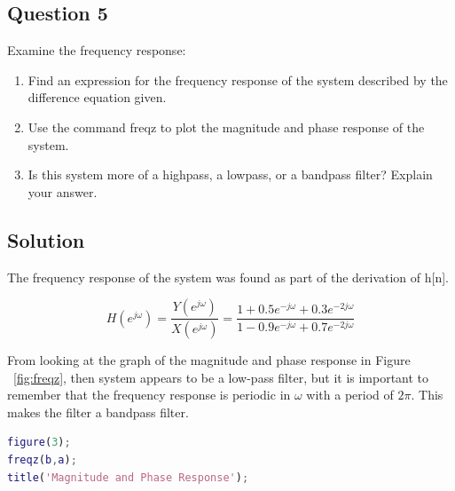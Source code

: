 \documentclass{article}
\begin{document}
\newpage
\subsection*{Question 5}

\begin{par}
Examine the frequency response:
\end{par} \vspace{1em}
\begin{enumerate}
\setlength{\itemsep}{-1ex}
   \item Find an expression for the frequency response of the system described by the difference equation given.
   \item Use the command freqz to plot the magnitude and phase response of the system.
   \item Is this system more of a highpass, a lowpass, or a bandpass filter? Explain your answer.
\end{enumerate}


\subsection*{Solution}

\begin{par}
The frequency response of the system was found as part of the derivation of h[n].
\end{par} \vspace{1em}
\begin{par}
$$H(e^{j\omega}) = \frac{Y(e^{j\omega})}{X(e^{j\omega})} =
\frac{1 + 0.5e^{-j\omega} + 0.3e^{-2j\omega}}
{1 - 0.9e^{-j\omega} + 0.7e^{-2j\omega}}$$
\end{par} \vspace{1em}
\begin{par}
From looking at the graph of the magnitude and phase response in Figure ~\ref{fig:freqz}, then system appears to be a low-pass filter, but it is important to remember that the frequency response is periodic in $\omega$ with a period of $2\pi$.  This makes the filter a bandpass filter.
\end{par} \vspace{1em}
\begin{lstlisting}[language=matlab]
figure(3);
freqz(b,a);
title('Magnitude and Phase Response');
\end{lstlisting}
\end{document}
